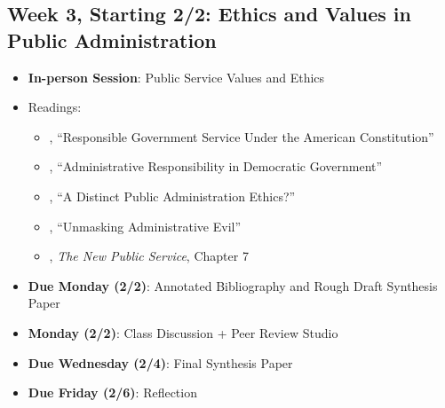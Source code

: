 \documentclass[11pt]{article}     %
\begin{document}
\subsection*{Week 3, Starting 2/2: Ethics and Values in Public Administration}
\begin{itemize}
    \item \textbf{In-person Session}: Public Service Values and Ethics
    \item Readings:
        \begin{itemize}
            \item \citet{friedrich1935}, ``Responsible Government Service Under the American Constitution''
            \item \citet{FINER1941}, ``Administrative Responsibility in Democratic Government''
            \item \citet{goss1996}, ``A Distinct Public Administration Ethics?''
            \item \citet{Adams2009}, ``Unmasking Administrative Evil''
            \item \citet{Denhardt2015}, \emph{The New Public Service}, Chapter 7
        \end{itemize}
    \item \textbf{Due Monday (2/2)}: Annotated Bibliography and Rough Draft Synthesis Paper
    \item \textbf{Monday (2/2)}: Class Discussion + Peer Review Studio
    \item \textbf{Due Wednesday (2/4)}: Final Synthesis Paper
    \item \textbf{Due Friday (2/6)}: Reflection
\end{itemize}
\end{document}
